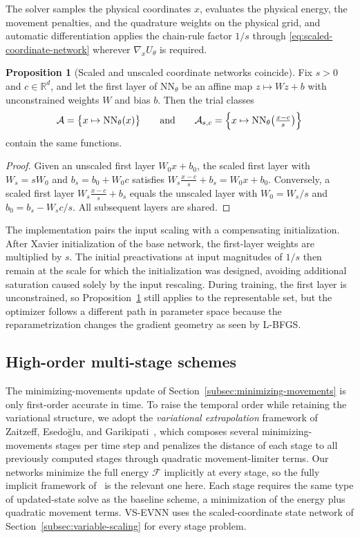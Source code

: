 \documentclass[11pt,letterpaper]{article}
\theoremstyle{plain}
\theoremstyle{definition}
\newtheorem{proposition}{Proposition}[section]
\newcommand{\grad}{\nabla}%
\newcommand{\E}{\mathcal{F}}
\begin{document}
The solver samples the physical coordinates \(x\), evaluates the physical energy, the movement penalties, and the quadrature weights on the physical grid, and automatic differentiation applies the chain-rule factor \(1/s\) through \eqref{eq:scaled-coordinate-network} wherever \(\grad_x U_\theta\) is required.

\begin{proposition}[Scaled and unscaled coordinate networks coincide]
\label{prop:equiv-coordinate}
Fix \(s>0\) and \(c\in\mathbb{R}^d\), and let the first layer of \(\mathrm{NN}_\theta\) be an affine map \(z\mapsto Wz+b\) with unconstrained weights \(W\) and bias \(b\). Then the trial classes
\[
\mathcal{A}
=\bigl\{x\mapsto \mathrm{NN}_\theta(x)\bigr\}
\qquad\text{and}\qquad
\mathcal{A}_{s,c}
=\Bigl\{x\mapsto \mathrm{NN}_\theta\bigl(\tfrac{x-c}{s}\bigr)\Bigr\}
\]
contain the same functions.
\end{proposition}

\begin{proof}
Given an unscaled first layer \(W_0x+b_0\), the scaled first layer with \(W_s=sW_0\) and \(b_s=b_0+W_0c\) satisfies \(W_s\frac{x-c}{s}+b_s=W_0x+b_0\). Conversely, a scaled first layer \(W_s\frac{x-c}{s}+b_s\) equals the unscaled layer with \(W_0=W_s/s\) and \(b_0=b_s-W_sc/s\). All subsequent layers are shared.
\end{proof}


The implementation pairs the input scaling with a compensating initialization. After Xavier initialization of the base network, the first-layer weights are multiplied by \(s\). The initial preactivations at input magnitudes of \(1/s\) then remain at the scale for which the initialization was designed, avoiding additional saturation caused solely by the input rescaling. During training, the first layer is unconstrained, so Proposition~\ref{prop:equiv-coordinate} still applies to the representable set, but the optimizer follows a different path in parameter space because the reparametrization changes the gradient geometry as seen by L-BFGS. 


\subsection{High-order multi-stage schemes} The minimizing-movements update of Section~\ref{subsec:minimizing-movements} is only first-order accurate in time. To raise the temporal order while retaining the variational structure, we adopt the \emph{variational extrapolation} framework of Zaitzeff, Esedo\u{g}lu, and Garikipati~\cite{Zaitzeff2020}, which composes several minimizing-movements stages per time step and penalizes the distance of each stage to all previously computed stages through quadratic movement-limiter terms. Our networks minimize the full energy $\E$ implicitly at every stage, so the fully implicit framework of~\cite{Zaitzeff2020} is the relevant one here. Each stage requires the same type of updated-state solve as the baseline scheme, a minimization of the energy plus quadratic movement terms. VS-EVNN uses the scaled-coordinate state network of Section~\ref{subsec:variable-scaling} for every stage problem.
\end{document}

